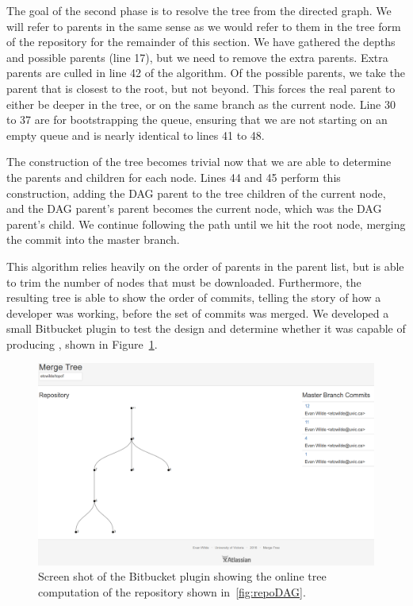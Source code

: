 The goal of the second phase is to resolve the tree from the directed
graph. We will refer to parents in the same sense as we would refer to
them in the tree form of the repository for the remainder of this
section. We have gathered the depths and possible parents (line 17), but
we need to remove the extra parents. Extra parents are culled in line 42
of the algorithm. Of the possible parents, we take the parent that is
closest to the root, but not beyond. This forces the real parent to
either be deeper in the tree, or on the same branch as the current node.
Line 30 to 37 are for bootstrapping the queue, ensuring that we are not
starting on an empty queue and is nearly identical to lines 41 to 48.

The construction of the tree becomes trivial now that we are able to
determine the parents and children for each node. Lines 44 and 45
perform this construction, adding the DAG parent to the tree children of the
current node, and the DAG parent's parent becomes the current node,
which was the DAG parent's child. We continue following the path until
we hit the root node, merging the commit into the master branch.

This algorithm relies heavily on the order of parents in the parent
list, but is able to trim the number of nodes that must be downloaded.
Furthermore, the resulting tree is able to show the order of commits,
telling the story of how a developer was working, before the set of
commits was merged. We developed a small Bitbucket plugin to test the
design and determine whether it was capable of producing ,
shown in Figure~\ref{fig:b_plugin}.

\begin{figure}[htpb]
  \centering
  \includegraphics[width=\linewidth]{figures/plugin.png}
  \caption{Screen shot of the Bitbucket plugin showing the online tree
    computation of the repository shown in~\ref{fig:repoDAG}.}
  \label{fig:b_plugin}
\end{figure}


